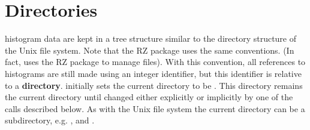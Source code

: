 %
% 
% 
%
% 
 
\section{Directories}
\label{HDIRECTO}
 
\HBOOK{} histogram data are kept in a \ZEBRA{}
tree structure similar to the directory structure
of the Unix file system.
%
%
Note that the \ZEBRA{} RZ package uses the same conventions. (In fact,
\HBOOK{} uses the \ZEBRA{} RZ package to manage files).
With this convention, all references to histograms
are still made using an integer identifier, but this identifier
is relative to a {\bf directory}.
\HBOOK{} initially sets the current directory to be .
This directory remains the current directory until changed either explicitly
or implicitly by one of the calls described below.
As with the Unix file system the current directory can be
a subdirectory, e.g. ,
 and .
 
